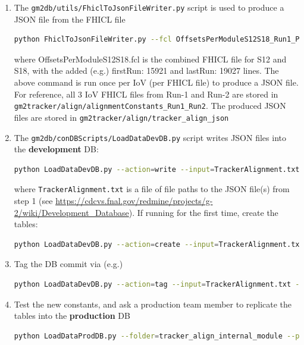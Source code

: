 \documentclass[12pt]{article}
\begin{document}
\begin{enumerate}
    \item The \verb!gm2db/utils/FhiclToJsonFileWriter.py! script is used to produce a JSON file from the FHICL file
     \begin{lstlisting}[language=bash]
     python FhiclToJsonFileWriter.py --fcl OffsetsPerModuleS12S18_Run1_Period_1_of_1_15921_19027.fcl --ana tracker_align_internal_module --iov run_range --path tracker_align_json \end{lstlisting}

     where OffsetsPerModuleS12S18.fcl is the combined FHICL file for S12 and S18, with the added (e.g.) firstRun: 15921 and lastRun: 19027 lines. The above command is run once per IoV (per FHICL file) to produce a JSON file. For reference, all 3 IoV FHICL files from Run-1 and Run-2 are stored in \verb!gm2tracker/align/alignmentConstants_Run1_Run2!. The produced JSON files are stored in \verb!gm2tracker/align/tracker_align_json!
     \item The \verb!gm2db/conDBScripts/LoadDataDevDB.py! script writes JSON files into the \textbf{development} DB:
      \begin{lstlisting}[language=bash]
      python LoadDataDevDB.py --action=write --input=TrackerAlignment.txt\end{lstlisting}
      where \verb!TrackerAlignment.txt! is a file of file paths to the JSON file(s) from step 1 (see \url{https://cdcvs.fnal.gov/redmine/projects/g-2/wiki/Development_Database}).
      If running for the first time, create the tables:
       \begin{lstlisting}[language=bash]
       python LoadDataDevDB.py --action=create --input=TrackerAlignment.txt \end{lstlisting}
       \item Tag the DB commit via (e.g.)
       \begin{lstlisting}[language=bash]
       python LoadDataDevDB.py --action=tag --input=TrackerAlignment.txt --tag=v9_28_00 \end{lstlisting}
       \item Test the new constants, and ask a production team member to replicate the tables into the \textbf{production} DB
        \begin{lstlisting}[language=bash]
        python LoadDataProdDB.py --folder=tracker_align_internal_module --prodTag v9_28_00 --devTag v9_28_00 \end{lstlisting}
\end{enumerate}
\end{document}
